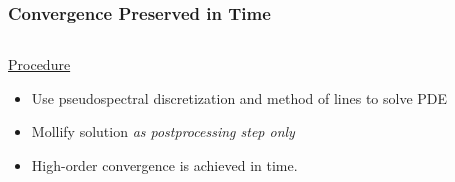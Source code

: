 \documentclass[9pt,usepdftitle=false,aspectratio=169]{beamer}
\begin{document}
\begin{frame}
  \frametitle{Convergence Preserved in Time}
  \begin{columns}
    \begin{column}{0.5\textwidth}
      \begin{center}
        \underline{\huge\color{blue}Procedure}
      \end{center}
      \begin{itemize}
      \item Use pseudospectral discretization and method of lines to
        solve PDE
      \item Mollify solution \textit{as postprocessing step only}
      \item High-order convergence is achieved in time.
      \end{itemize}
    \end{column}
    \begin{column}{0.5\textwidth}
      
    \end{column}
  \end{columns}
\end{frame}
\end{document}
